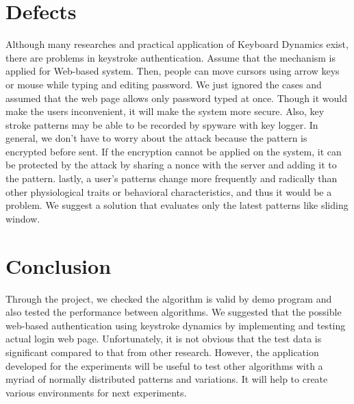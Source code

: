 \documentclass[twocolumn,showpacs,%
  nofootinbib,aps,%
  eqsecnum,prd,notitlepage,showkeys,10pt]{revtex4-1}
\begin{document}
\section{Defects}
Although many researches and practical application of Keyboard Dynamics exist, there are problems in keystroke authentication. Assume that the mechanism is applied for Web-based system. Then, people can move cursors using arrow keys or mouse while typing and editing password. We just ignored the cases and assumed that the web page allows only password typed at once. Though it would make the users inconvenient, it will make the system more secure. Also, key stroke patterns may be able to be recorded by spyware with key logger. In general, we don't have to worry about the attack because the pattern is encrypted before sent. If the encryption cannot be applied on the system, it can be protected by the attack by sharing a nonce with the server and adding it to the pattern. lastly, a user's patterns change more frequently and radically than other physiological traits or behavioral characteristics, and thus it would be a problem. We suggest a solution that evaluates only the latest patterns like sliding window.

\section{Conclusion}
Through the project, we checked the algorithm is valid by demo program and also tested the performance between algorithms. We suggested that the possible web-based authentication using keystroke dynamics by implementing and testing actual login web page. Unfortunately, it is not obvious that the test data is significant compared to that from other research. However, the application developed for the experiments will be useful to test other algorithms with a myriad of normally distributed patterns and variations. It will help to create various environments for next experiments.



\end{document}
